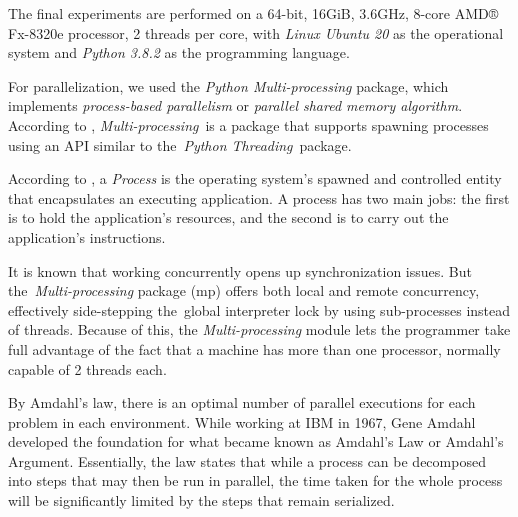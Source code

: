 \documentclass[preprint,authoryear]{elsarticle}
\begin{document}
The final experiments are performed on a 64-bit, 16GiB, 3.6GHz, 8-core AMD® Fx-8320e processor, 2 threads per core, with {\it Linux Ubuntu 20} as the operational system and {\it Python 3.8.2} as the programming language.

For parallelization, we used the {\it Python Multi-processing} package, which implements {\it process-based parallelism} or {\it parallel shared memory algorithm}. According to \cite{multiprocessing}, {\it Multi-processing} is a package that supports spawning processes using an API similar to the {\it Python Threading} package.

According to \cite[p.271]{Breshears2009}, a {\it Process} is the operating system’s spawned and controlled entity that encapsulates an executing application. A process has two main jobs: the first is to hold the application's resources, and the second is to carry out the application's instructions. 

It is known that working concurrently opens up synchronization issues. But the {\it Multi-processing} package (mp) offers both local and remote concurrency, effectively side-stepping the global interpreter lock by using sub-processes instead of threads. Because of this, the {\it Multi-processing} module lets the programmer take full advantage of the fact that a machine has more than one processor, normally capable of 2 threads each.

By Amdahl's law, there is an optimal number of parallel executions for each problem in each environment. While working at IBM in 1967, Gene Amdahl developed the foundation for what became known as Amdahl's Law or Amdahl's Argument. Essentially, the law states that while a process can be decomposed into steps that may then be run in parallel, the time taken for the whole process will be significantly limited by the steps that remain serialized.
\end{document}
